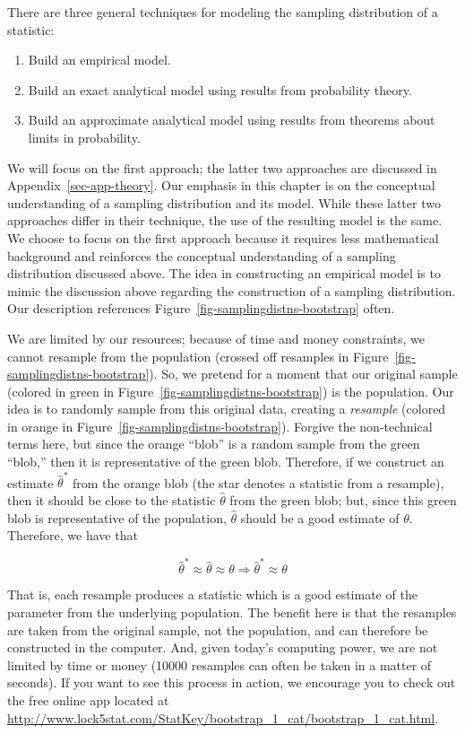 \documentclass[
  letterpaper,
  DIV=11,
  numbers=noendperiod]{scrreprt}
\providecommand{\tightlist}{%
  \setlength{\itemsep}{0pt}\setlength{\parskip}{0pt}}\usepackage{longtable,booktabs,array}
\theoremstyle{definition}
\theoremstyle{definition}
\theoremstyle{plain}
\theoremstyle{remark}
\begin{document}
There are three general techniques for modeling the sampling
distribution of a statistic:

\begin{enumerate}
\def\labelenumi{\arabic{enumi}.}
\tightlist
\item
  Build an empirical model.
\item
  Build an exact analytical model using results from probability theory.
\item
  Build an approximate analytical model using results from theorems
  about limits in probability.
\end{enumerate}

We will focus on the first approach; the latter two approaches are
discussed in Appendix~\ref{sec-app-theory}. Our emphasis in this chapter
is on the conceptual understanding of a sampling distribution and its
model. While these latter two approaches differ in their technique, the
use of the resulting model is the same. We choose to focus on the first
approach because it requires less mathematical background and reinforces
the conceptual understanding of a sampling distribution discussed above.
The idea in constructing an empirical model is to mimic the discussion
above regarding the construction of a sampling distribution. Our
description references Figure~\ref{fig-samplingdistns-bootstrap} often.

We are limited by our resources; because of time and money constraints,
we cannot resample from the population (crossed off resamples in
Figure~\ref{fig-samplingdistns-bootstrap}). So, we pretend for a moment
that our original sample (colored in green in
Figure~\ref{fig-samplingdistns-bootstrap}) is the population. Our idea
is to randomly sample from this original data, creating a
\emph{resample} (colored in orange in
Figure~\ref{fig-samplingdistns-bootstrap}). Forgive the non-technical
terms here, but since the orange ``blob'' is a random sample from the
green ``blob,'' then it is representative of the green blob. Therefore,
if we construct an estimate \(\widehat{\theta}^*\) from the orange blob
(the star denotes a statistic from a resample), then it should be close
to the statistic \(\widehat{\theta}\) from the green blob; but, since
this green blob is representative of the population,
\(\widehat{\theta}\) should be a good estimate of \(\theta\). Therefore,
we have that

\[
\widehat{\theta}^* \approx \widehat{\theta} \approx \theta \Rightarrow \widehat{\theta}^* \approx \theta
\]

That is, each resample produces a statistic which is a good estimate of
the parameter from the underlying population. The benefit here is that
the resamples are taken from the original sample, not the population,
and can therefore be constructed in the computer. And, given today's
computing power, we are not limited by time or money (10000 resamples
can often be taken in a matter of seconds). If you want to see this
process in action, we encourage you to check out the free online app
located at
\url{http://www.lock5stat.com/StatKey/bootstrap_1_cat/bootstrap_1_cat.html}.
\end{document}
